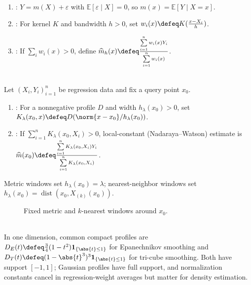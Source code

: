 \begin{definition} \label{def:nonparametric-regression-smoothing} 
\begin{enumerate}[label=(\roman*)]
\setlength{\itemsep}{0pt}
\item {}: $Y=m(X)+\varepsilon$ with $\mathbb{E}[\varepsilon\mid X]=0$, so $m(x)=\mathbb{E}[Y\mid X=x]$.
\item {}: For kernel $K$ and bandwidth $h>0$, set $w_i(x)\defeq K(\frac{x-X_i}{h})$.
\item {}: If $\sum\limits_iw_i(x)>0$, define $\widehat{m}_h(x)\defeq \frac{\sum\limits_{i=1}^nw_i(x)Y_i}{\sum\limits_{i=1}^nw_i(x)}$.
\end{enumerate}
\end{definition}

\begin{definition} \label{def:nadaraya-watson-kernel-smoother} \\
Let $(X_i,Y_i)_{i=1}^n$ be regression data and fix a query point $x_0$.
\begin{enumerate}[label=(\roman*)]
\setlength{\itemsep}{0pt}
\item {}: For a nonnegative profile $D$ and width $h_\lambda(x_0)>0$, set $K_\lambda(x_0,x)\defeq D(\norm{x-x_0}/h_\lambda(x_0))$.
\item {}: If $\sum\limits_{i=1}^nK_\lambda(x_0,X_i)>0$, local-constant (Nadaraya--Watson) estimate is $\widehat{m}(x_0)\defeq\frac{\sum\limits_{i=1}^nK_\lambda(x_0,X_i)Y_i}{\sum\limits_{i=1}^nK_\lambda(x_0,X_i)}$.
\end{enumerate}
Metric windows set $h_\lambda(x_0)=\lambda$; nearest-neighbor windows set $h_\lambda(x_0)=\operatorname{dist}(x_0,X_{(k)}(x_0))$.
\end{definition}

\begin{figure}[H]
  \centering
  
  \caption{Fixed metric and $k$-nearest windows around $x_0$.}
  \label{fig:kernel-smoothing-windows}
\end{figure}

\begin{example} \label{ex:compact-kernels-for-local-smoothing} \\
In one dimension, common compact profiles are $D_E(t)\defeq\frac34(1-t^2)\mathbf{1}_{\{\abs{t}\leq1\}}$ for Epanechnikov smoothing and $D_T(t)\defeq(1-\abs{t}^3)^3\mathbf{1}_{\{\abs{t}\leq1\}}$ for tri-cube smoothing.
Both have support $[-1,1]$; Gaussian profiles have full support, and normalization constants cancel in regression-weight averages but matter for density estimation.
\end{example}


